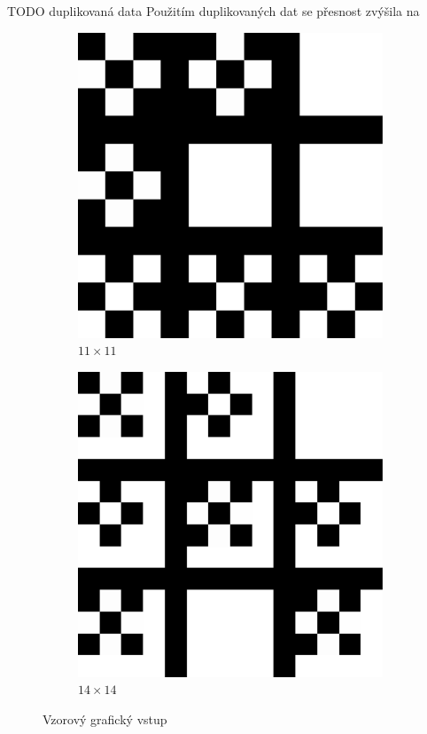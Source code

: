\documentclass[10pt,a4paper]{article}
\begin{document}
TODO duplikovaná data
Použitím duplikovaných dat se přesnost zvýšila na



\begin{figure}[h!]
\centering
\begin{subfigure}{.5\textwidth}
  \centering
  \includegraphics[scale=0.1]{vzor11}
  \caption{$11\times 11$}
  \label{fig:v1}
\end{subfigure}%
\begin{subfigure}{.5\textwidth}
  \centering
  \includegraphics[scale=0.1]{vzor14}
  \caption{$14\times 14$}
  \label{fig:v2}
\end{subfigure}
\caption{Vzorový grafický vstup}
\label{fig:v}
\end{figure}
\end{document}
